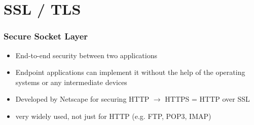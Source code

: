 \documentclass[final]{article}
\begin{document}
\section{SSL / TLS}
\subsubsection*{Secure Socket Layer}
\begin{itemize}[nosep]
    \item End-to-end security between two applications
    \item Endpoint applications can implement it without the help of the operating systems or any intermediate devices
    \item Developed by Netscape for securing HTTP $\rightarrow$ HTTPS = HTTP over SSL
    \item very widely used, not just for HTTP (e.g. FTP, POP3, IMAP)
\end{itemize}
\end{document}
